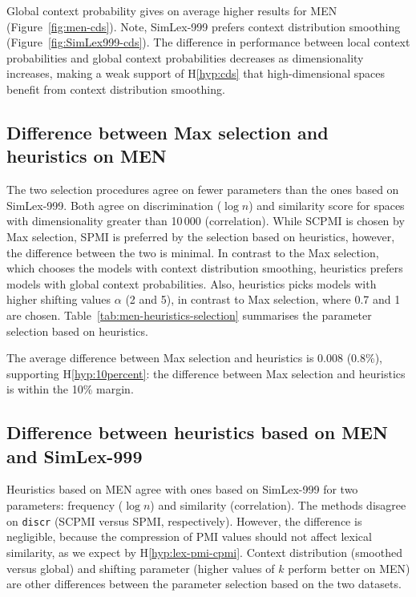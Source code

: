 
Global context probability gives on average higher results for MEN (Figure~\ref{fig:men-cds}). Note, SimLex-999 prefers context distribution smoothing (Figure~\ref{fig:SimLex999-cds}). The difference in performance between local context probabilities and global context probabilities decreases as dimensionality increases, making a weak support of H\ref{hyp:cds} that high-dimensional spaces benefit from context distribution smoothing.

\subsection{Difference between Max selection and heuristics on MEN}

The two selection procedures agree on fewer parameters than the ones based on SimLex-999. Both agree on discrimination ($\log n$) and similarity score for spaces with dimensionality greater than 10\,000 (correlation). While SCPMI is chosen by Max selection, SPMI is preferred by the selection based on heuristics, however, the difference between the two is minimal. In contrast to the Max selection, which chooses the models with context distribution smoothing, heuristics prefers models with global context probabilities. Also, heuristics picks models with higher shifting values $\alpha$ (2 and 5), in contrast to Max selection, where 0.7 and 1 are chosen. Table~\ref{tab:men-heuristics-selection} summarises the parameter selection based on heuristics.

The average difference between Max selection and heuristics is 0.008 (0.8\%), supporting H\ref{hyp:10percent}: the difference between Max selection and heuristics is within the 10\% margin.

\subsection{Difference between heuristics based on MEN and SimLex-999}

Heuristics based on MEN agree with ones based on SimLex-999 for two parameters: frequency ($\log n$) and similarity (correlation). The methods disagree on \texttt{discr} (SCPMI versus SPMI, respectively). However, the difference is negligible, because the compression of PMI values should not affect lexical similarity, as we expect by H\ref{hyp:lex-pmi-cpmi}. Context distribution (smoothed versus global) and shifting parameter (higher values of $k$ perform better on MEN) are other differences between the parameter selection based on the two datasets.

